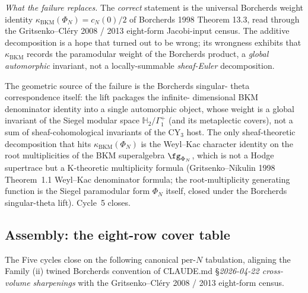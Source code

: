 \emph{What the failure replaces.} The \emph{correct} statement
is the universal Borcherds weight identity
$\kappa_{\mathrm{BKM}}(\Phi_N) = c_N(0)/2$ of Borcherds 1998
Theorem 13.3, read through the Gritsenko--Cl\'ery 2008 / 2013
eight-form Jacobi-input census. The additive decomposition is
a hope that turned out to be wrong; its wrongness exhibits that
$\kappa_{\mathrm{BKM}}$ records the paramodular weight of the
Borcherds product, a \emph{global automorphic} invariant, not a
locally-summable \emph{sheaf-Euler} decomposition.

The geometric source of the failure is the Borcherds singular-
theta correspondence itself: the lift packages the infinite-
dimensional BKM denominator identity into a single automorphic
object, whose weight is a global invariant of the Siegel modular
space $\mathbb{H}_2/\Gamma^+_1$ (and its metaplectic covers),
not a sum of sheaf-cohomological invariants of the CY$_3$ host.
The only sheaf-theoretic decomposition that hits
$\kappa_{\mathrm{BKM}}(\Phi_N)$ is the Weyl--Kac character
identity on the root multiplicities of the BKM superalgebra
$\fg_{\Phi_N}$, which is not a Hodge supertrace but a
K-theoretic multiplicity formula (Gritsenko--Nikulin 1998
Theorem~1.1 Weyl--Kac denominator formula; the root-multiplicity
generating function is the Siegel paramodular form $\Phi_N$
itself, closed under the Borcherds singular-theta lift).
Cycle~5 closes.

\subsection*{Assembly: the eight-row cover table}

The Five cycles close on the following canonical per-$N$
tabulation, aligning the Family (ii) twined Borcherds
convention of CLAUDE.md \S\emph{2026-04-22 cross-volume
sharpenings} with the Gritsenko--Cl\'ery 2008 / 2013 eight-form
census.

